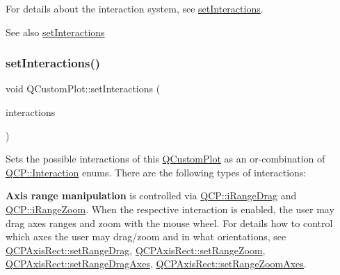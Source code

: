 For details about the interaction system, see \mbox{\hyperlink{class_q_custom_plot_a5ee1e2f6ae27419deca53e75907c27e5}{set\+Interactions}}.

\begin{DoxySeeAlso}{See also}
\mbox{\hyperlink{class_q_custom_plot_a5ee1e2f6ae27419deca53e75907c27e5}{set\+Interactions}} 
\end{DoxySeeAlso}
\mbox{\label{class_q_custom_plot_a5ee1e2f6ae27419deca53e75907c27e5}} 
\subsubsection{\texorpdfstring{set\+Interactions()}{setInteractions()}}
{\footnotesize\ttfamily void Q\+Custom\+Plot\+::set\+Interactions (\begin{DoxyParamCaption}\item[{const Q\+C\+P\+::\+Interactions \&}]{interactions }\end{DoxyParamCaption})}

Sets the possible interactions of this \mbox{\hyperlink{class_q_custom_plot}{Q\+Custom\+Plot}} as an or-\/combination of \mbox{\hyperlink{namespace_q_c_p_a2ad6bb6281c7c2d593d4277b44c2b037}{Q\+C\+P\+::\+Interaction}} enums. There are the following types of interactions\+:

{\bfseries Axis range manipulation} is controlled via \mbox{\hyperlink{namespace_q_c_p_a2ad6bb6281c7c2d593d4277b44c2b037a2c4432b9aceafb94000be8d1b589ef18}{Q\+C\+P\+::i\+Range\+Drag}} and \mbox{\hyperlink{namespace_q_c_p_a2ad6bb6281c7c2d593d4277b44c2b037abee1e94353525a636aeaf0ba32b72e14}{Q\+C\+P\+::i\+Range\+Zoom}}. When the respective interaction is enabled, the user may drag axes ranges and zoom with the mouse wheel. For details how to control which axes the user may drag/zoom and in what orientations, see \mbox{\hyperlink{class_q_c_p_axis_rect_ae6aef2f7211ba6097c925dcd26008418}{Q\+C\+P\+Axis\+Rect\+::set\+Range\+Drag}}, \mbox{\hyperlink{class_q_c_p_axis_rect_a7960a9d222f1c31d558b064b60f86a31}{Q\+C\+P\+Axis\+Rect\+::set\+Range\+Zoom}}, \mbox{\hyperlink{class_q_c_p_axis_rect_a648cce336bd99daac4a5ca3e5743775d}{Q\+C\+P\+Axis\+Rect\+::set\+Range\+Drag\+Axes}}, \mbox{\hyperlink{class_q_c_p_axis_rect_a9442cca2aa358405f39a64d51eca13d2}{Q\+C\+P\+Axis\+Rect\+::set\+Range\+Zoom\+Axes}}.

